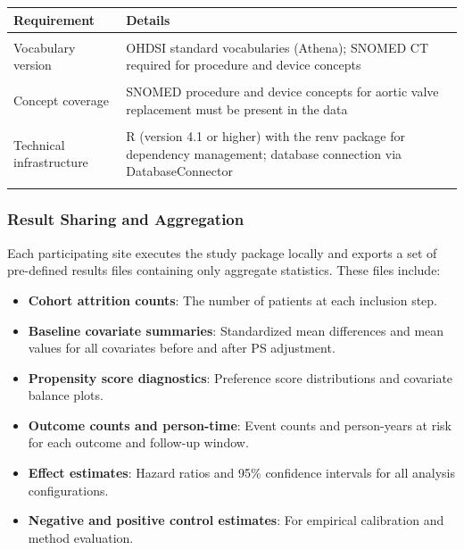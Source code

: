 \documentclass[
  12pt,
]{article}
\providecommand{\tightlist}{%
  \setlength{\itemsep}{0pt}\setlength{\parskip}{0pt}}
\begin{document}
\begin{longtable}[t]{>{\raggedright\arraybackslash}p{10em}>{\raggedright\arraybackslash}p{30em}}
\toprule
Requirement & Details\\
\midrule
\cellcolor{gray!10}{OMOP CDM version} & \cellcolor{gray!10}{Version 5.4}\\
Vocabulary version & OHDSI standard vocabularies (Athena); SNOMED CT required for procedure and device concepts\\
\cellcolor{gray!10}{Minimum data period} & \cellcolor{gray!10}{At least one year of continuous observation data prior to first observed TAVR or SAVR procedure in the database}\\
Concept coverage & SNOMED procedure and device concepts for aortic valve replacement must be present in the data\\
\cellcolor{gray!10}{Minimum cohort size} & \cellcolor{gray!10}{At least 50 patients in either the TAVR or SAVR cohort (sites with smaller populations are encouraged to discuss with the study coordinator)}\\
\addlinespace
Technical infrastructure & R (version 4.1 or higher) with the renv package for dependency management; database connection via DatabaseConnector\\
\cellcolor{gray!10}{Data governance} & \cellcolor{gray!10}{Local IRB waiver or approval and data use authorization as required by institutional policy}\\
\bottomrule
\end{longtable}
\endgroup{}

\subsubsection{Result Sharing and
Aggregation}\label{result-sharing-and-aggregation}

Each participating site executes the study package locally and exports a
set of pre-defined results files containing only aggregate statistics.
These files include:

\begin{itemize}
\tightlist
\item
  \textbf{Cohort attrition counts}: The number of patients at each
  inclusion step.
\item
  \textbf{Baseline covariate summaries}: Standardized mean differences
  and mean values for all covariates before and after PS adjustment.
\item
  \textbf{Propensity score diagnostics}: Preference score distributions
  and covariate balance plots.
\item
  \textbf{Outcome counts and person-time}: Event counts and person-years
  at risk for each outcome and follow-up window.
\item
  \textbf{Effect estimates}: Hazard ratios and 95\% confidence intervals
  for all analysis configurations.
\item
  \textbf{Negative and positive control estimates}: For empirical
  calibration and method evaluation.
\end{itemize}
\end{document}
